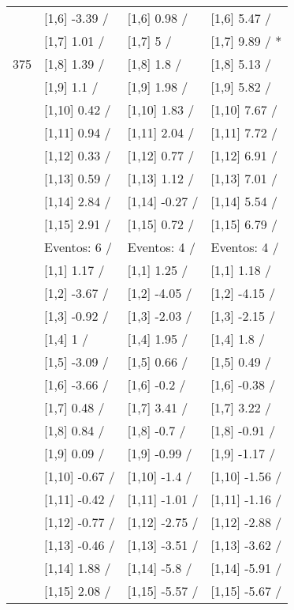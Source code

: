 \begin{table}
\begin{tabular}[t]{llll}
 & {}[1,6] -3.39  / & {}[1,6] 0.98  / & {}[1,6] 5.47  /\\
 & {}[1,7] 1.01  / & {}[1,7] 5  / & {}[1,7] 9.89  / *\\
375 & {}[1,8] 1.39  / & {}[1,8] 1.8  / & {}[1,8] 5.13  /\\
\addlinespace
 & {}[1,9] 1.1  / & {}[1,9] 1.98  / & {}[1,9] 5.82  /\\
 & {}[1,10] 0.42  / & {}[1,10] 1.83  / & {}[1,10] 7.67  /\\
 & {}[1,11] 0.94  / & {}[1,11] 2.04  / & {}[1,11] 7.72  /\\
 & {}[1,12] 0.33  / & {}[1,12] 0.77  / & {}[1,12] 6.91  /\\
 & {}[1,13] 0.59  / & {}[1,13] 1.12  / & {}[1,13] 7.01  /\\
\addlinespace
 & {}[1,14] 2.84  / & {}[1,14] -0.27  / & {}[1,14] 5.54  /\\
 & {}[1,15] 2.91  / & {}[1,15] 0.72  / & {}[1,15] 6.79  /\\
 & Eventos:  6 / & Eventos:  4 / & Eventos:  4 /\\
 & {}[1,1] 1.17  / & {}[1,1] 1.25  / & {}[1,1] 1.18  /\\
 & {}[1,2] -3.67  / & {}[1,2] -4.05  / & {}[1,2] -4.15  /\\
\addlinespace
 & {}[1,3] -0.92  / & {}[1,3] -2.03  / & {}[1,3] -2.15  /\\
 & {}[1,4] 1  / & {}[1,4] 1.95  / & {}[1,4] 1.8  /\\
 & {}[1,5] -3.09  / & {}[1,5] 0.66  / & {}[1,5] 0.49  /\\
 & {}[1,6] -3.66  / & {}[1,6] -0.2  / & {}[1,6] -0.38  /\\
 & {}[1,7] 0.48  / & {}[1,7] 3.41  / & {}[1,7] 3.22  /\\
\addlinespace
500 & {}[1,8] 0.84  / & {}[1,8] -0.7  / & {}[1,8] -0.91  /\\
 & {}[1,9] 0.09  / & {}[1,9] -0.99  / & {}[1,9] -1.17  /\\
 & {}[1,10] -0.67  / & {}[1,10] -1.4  / & {}[1,10] -1.56  /\\
 & {}[1,11] -0.42  / & {}[1,11] -1.01  / & {}[1,11] -1.16  /\\
 & {}[1,12] -0.77  / & {}[1,12] -2.75  / & {}[1,12] -2.88  /\\
\addlinespace
 & {}[1,13] -0.46  / & {}[1,13] -3.51  / & {}[1,13] -3.62  /\\
 & {}[1,14] 1.88  / & {}[1,14] -5.8  / & {}[1,14] -5.91  /\\
 & {}[1,15] 2.08  / & {}[1,15] -5.57  / & {}[1,15] -5.67  /\\
\bottomrule
\end{tabular}
\end{table}
